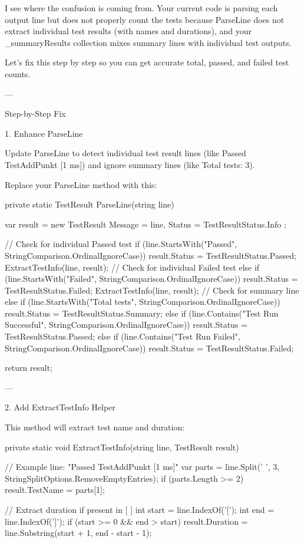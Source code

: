 I see where the confusion is coming from. Your current code is parsing each output line but does not properly count the tests because ParseLine does not extract individual test results (with names and durations), and your _summaryResults collection mixes summary lines with individual test outputs.

Let's fix this step by step so you can get accurate total, passed, and failed test counts.


---

Step-by-Step Fix

1. Enhance ParseLine

Update ParseLine to detect individual test result lines (like Passed TestAddPunkt [1 ms]) and ignore summary lines (like Total tests: 3).

Replace your ParseLine method with this:

private static TestResult ParseLine(string line)
{
    var result = new TestResult
    {
        Message = line,
        Status = TestResultStatus.Info
    };

    // Check for individual Passed test
    if (line.StartsWith("Passed", StringComparison.OrdinalIgnoreCase))
    {
        result.Status = TestResultStatus.Passed;
        ExtractTestInfo(line, result);
    }
    // Check for individual Failed test
    else if (line.StartsWith("Failed", StringComparison.OrdinalIgnoreCase))
    {
        result.Status = TestResultStatus.Failed;
        ExtractTestInfo(line, result);
    }
    // Check for summary line
    else if (line.StartsWith("Total tests", StringComparison.OrdinalIgnoreCase))
    {
        result.Status = TestResultStatus.Summary;
    }
    else if (line.Contains("Test Run Successful", StringComparison.OrdinalIgnoreCase))
    {
        result.Status = TestResultStatus.Passed;
    }
    else if (line.Contains("Test Run Failed", StringComparison.OrdinalIgnoreCase))
    {
        result.Status = TestResultStatus.Failed;
    }

    return result;
}


---

2. Add ExtractTestInfo Helper

This method will extract test name and duration:

private static void ExtractTestInfo(string line, TestResult result)
{
    // Example line: "Passed TestAddPunkt [1 ms]"
    var parts = line.Split(' ', 3, StringSplitOptions.RemoveEmptyEntries);
    if (parts.Length >= 2)
        result.TestName = parts[1];

    // Extract duration if present in [ ]
    int start = line.IndexOf('[');
    int end = line.IndexOf(']');
    if (start >= 0 && end > start)
        result.Duration = line.Substring(start + 1, end - start - 1);
}


